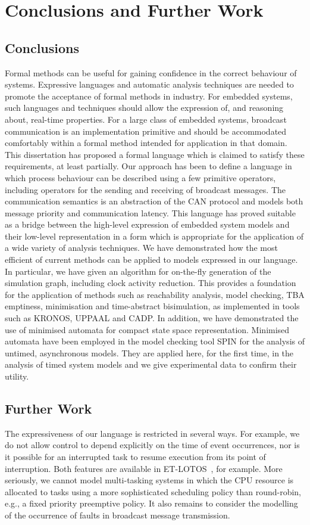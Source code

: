 \chapter{Conclusions and Further Work}\label{chap:conc}
\section{Conclusions}
Formal methods can be useful for gaining confidence in the correct
behaviour of systems. Expressive languages and automatic analysis
techniques are needed to promote the acceptance of formal methods in
industry. For embedded systems, such languages and techniques should
allow the expression of, and reasoning about, real-time
properties. For a large class of embedded systems, broadcast
communication is an implementation primitive and should be accommodated
comfortably within a formal method intended for application in that
domain. This dissertation has proposed a formal language which is
claimed to satisfy these requirements, at least partially. Our
approach has been to define a language in which process behaviour can
be described using a few primitive operators, including operators for
the sending and receiving of broadcast messages. The communication
semantics is an abstraction of the CAN protocol and models both
message priority and communication latency. This language has proved
suitable as a bridge between the high-level expression of embedded
system models and their low-level representation in a form which is
appropriate for the application of a wide variety of analysis
techniques. We have demonstrated how the most efficient of current
methods can be applied to models expressed in our language. In
particular, we have given an algorithm for on-the-fly generation of
the simulation graph, including clock activity reduction. This
provides a foundation for the application of methods such as
reachability analysis, model checking, TBA emptiness, minimisation and
time-abstract bisimulation, as implemented in tools such as KRONOS,
UPPAAL and CADP. In addition, we have demonstrated the use of
minimised automata for compact state space representation. Minimised
automata have been employed in the model checking tool SPIN for the
analysis of untimed, asynchronous models.  They are applied here, for
the first time, in the analysis of timed system models and we give
experimental data to confirm their utility.
   
 
\section{Further Work}
The expressiveness of our language is restricted in several ways. For
example, we do not allow control to
depend explicitly on the time of event occurrences, nor is it possible for
an interrupted task to resume
execution from its point of interruption. Both features are available
in ET-LOTOS~\cite{her:98}, for example. More seriously, we cannot
model multi-tasking systems in which the CPU resource is allocated to
tasks using a more sophisticated scheduling policy than round-robin,
e.g., a fixed priority preemptive policy. It also remains to consider
the modelling of the occurrence of faults in broadcast
message transmission.

